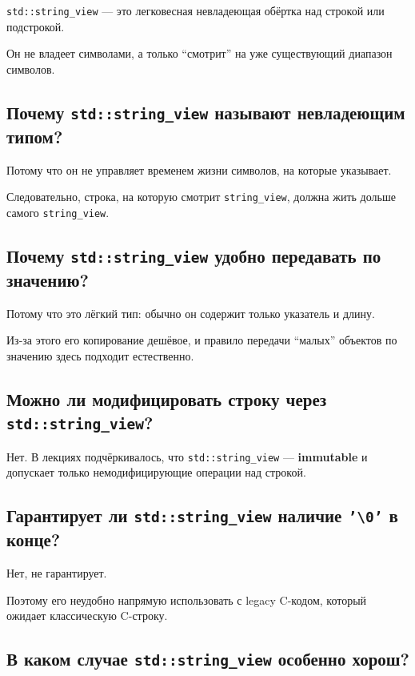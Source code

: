 \texttt{std::string\_view} --- это легковесная невладеющая обёртка над строкой или подстрокой.

Он не владеет символами, а только ``смотрит'' на уже существующий диапазон символов.


\subsection{Почему \texttt{std::string\_view} называют невладеющим типом?}

Потому что он не управляет временем жизни символов, на которые указывает.

Следовательно, строка, на которую смотрит \texttt{string\_view}, должна жить дольше самого \texttt{string\_view}.


\subsection{Почему \texttt{std::string\_view} удобно передавать по значению?}

Потому что это лёгкий тип: обычно он содержит только указатель и длину.

Из-за этого его копирование дешёвое, и правило передачи ``малых'' объектов по значению здесь подходит естественно.


\subsection{Можно ли модифицировать строку через \texttt{std::string\_view}?}

Нет. В лекциях подчёркивалось, что \texttt{std::string\_view} --- \textbf{immutable} и допускает только немодифицирующие операции над строкой.


\subsection{Гарантирует ли \texttt{std::string\_view} наличие \texttt{'\textbackslash 0'} в конце?}

Нет, не гарантирует.

Поэтому его неудобно напрямую использовать с legacy C-кодом, который ожидает классическую C-строку.


\subsection{В каком случае \texttt{std::string\_view} особенно хорош?}


